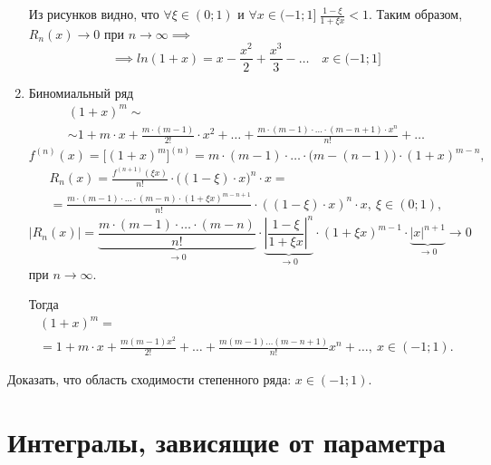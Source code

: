 \begin{note}
\begin{enumerate}
              Из рисунков видно, что $\forall \xi \in (0;1)$ и $\forall x \in (-1;1] \ \frac{1-\xi}{1 + \xi x} < 1$. Таким образом, $R_n(x) \rightarrow 0$ при $n \rightarrow \infty \implies$
              \[
                  \implies ln(1+x) = x - \frac{x^2}{2} + \frac{x^3}{3} - \ldots \quad x \in (-1;1]
              \]

        \item Биномиальный ряд
              \begin{multline*}
                  (1 + x)^m \sim \\
                  \sim 1 + m \cdot x + \frac{m\cdot(m-1)}{2!}\cdot x^2 + \ldots + \frac{m\cdot(m-1)\cdot \ldots \cdot(m-n+1)\cdot x^n}{n!} + \ldots
              \end{multline*}
              \[
                  f^{(n)}(x) = \big[(1+x)^m\big]^{(n)} = m \cdot (m-1) \cdot \ldots \cdot \big(m-(n-1)\big) \cdot (1 + x)^{m - n},
              \]
              \begin{multline*}
                  R_n(x) = \frac{f^{(n+1)}(\xi x)}{n!}\cdot \big((1-\xi) \cdot x\big)^n \cdot x = \\
                  = \frac{m \cdot (m-1) \cdot \ldots \cdot (m-n) \cdot (1 + \xi x)^{m - n + 1}}{n!} \cdot ((1-\xi) \cdot x)^n \cdot x, \ \xi \in (0;1),
              \end{multline*}
              \[
                  \left|R_n(x)\right| = \underbrace{\frac{m\cdot (m-1) \cdot \ldots \cdot (m-n)}{n!}}_{\rightarrow0}\cdot \underbrace{\left|\frac{1-\xi}{1 + \xi x}\right|^n}_{\rightarrow0} \cdot (1 + \xi x)^{m-1} \cdot \underbrace{|x|^{n+1}}_{\rightarrow 0} \rightarrow 0
              \]
              при $n \rightarrow \infty$.

              Тогда
              \begin{multline*}
                  (1 + x)^m = \\
                  = 1 + m\cdot x + \frac{m(m-1)x^2}{2!} + \ldots + \frac{m(m-1)\ldots(m-n+1)}{n!}x^n + \ldots, \ x \in (-1;1).
              \end{multline*}
    \end{enumerate}
\end{note}

\begin{note}[Упражнение]
    Доказать, что область сходимости степенного ряда: $ x \in (-1;1) $.
\end{note}

\chapter{Интегралы, зависящие от параметра}


